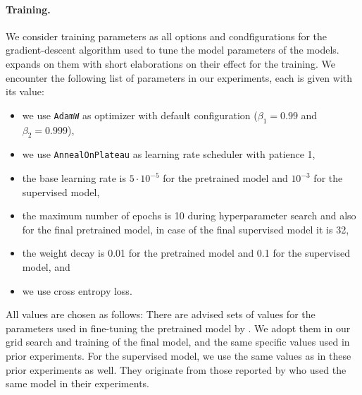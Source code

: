 \documentclass[../../document.tex]{subfiles}
\begin{document}
    \paragraph*{Training.}
    We consider training parameters as all options and condfigurations for the gradient-descent algorithm  used to tune the model parameters of the  models.
     expands on them with short elaborations on their effect for the training.
    We encounter the following list of parameters in our experiments, each is given with its value:
    \begin{itemize}
        \item we use \texttt{AdamW} as optimizer with default configuration ($\beta_1 = 0.99$ and $\beta_2 = 0.999$),
        \item we use \texttt{AnnealOnPlateau} as learning rate scheduler with patience 1,
        \item the base learning rate is $5\cdot 10^{-5}$ for the pretrained model and $10^{-3}$ for the supervised model,
        \item the maximum number of epochs is 10 during hyperparameter search and also for the final pretrained model, in case of the final supervised model it is 32,
        \item the weight decay is 0.01 for the pretrained model and 0.1 for the supervised model, and
        \item we use cross entropy loss.
    \end{itemize}
    All values are chosen as follows:
    There are advised sets of values for the parameters used in fine-tuning the pretrained model by \citet{Devlin2019}.
    We adopt them in our grid search and training of the final model, and the same specific values used in prior experiments. \citep[cf.\@][]{Rup22}
    For the supervised model, we use the same values as in these prior experiments as well.
    They originate from those reported by \citet{Cor20,StaSte20} who used the same model in their experiments.
\end{document}
